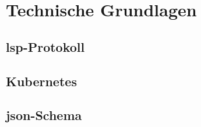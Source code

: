 \chapter{Technische Grundlagen}\label{ch:technical-basics}

\section{\acs{lsp}-Protokoll}

\section{Kubernetes}

\section{\acs{json}-Schema}